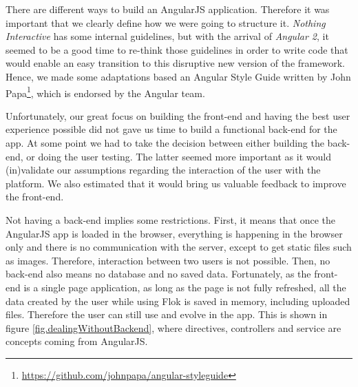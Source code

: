 \documentclass[a4paper,12pt, oneside]{article}
\begin{document}
There are different ways to build an AngularJS application.
Therefore it was important that we clearly define how we were going to structure it.
\emph{Nothing Interactive} has some internal guidelines, but with the arrival of \emph{Angular 2}, it seemed to be a good time to re-think those guidelines in order to write code that would enable an easy transition to this disruptive new version of the framework.
Hence, we made some adaptations based an Angular Style Guide written by John Papa\footnote{\url{https://github.com/johnpapa/angular-styleguide}}, which is endorsed by the Angular team.

Unfortunately, our great focus on building the front-end and having the best user experience possible did not gave us time to build a functional back-end for the app.
At some point we had to take the decision between either building the back-end, or doing the user testing.
The latter seemed more important as it would (in)validate our assumptions regarding the interaction of the user with the platform.
We also estimated that it would bring us valuable feedback to improve the front-end.

Not having a back-end implies some restrictions.
First, it means that once the AngularJS app is loaded in the browser, everything is happening in the browser only and there is no communication with the server, except to get static files such as images.
Therefore, interaction between two users is not possible.
Then, no back-end also means no database and no saved data.
Fortunately, as the front-end is a single page application, as long as the page is not fully refreshed, all the data created by the user while using Flok is saved in memory, including uploaded files.
Therefore the user can still use and evolve in the app.
This is shown in figure \ref{fig.dealingWithoutBackend}, where directives, controllers and service are concepts coming from AngularJS.
\end{document}
